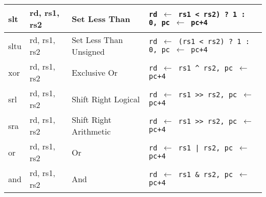 \begin{tabular}{|ll|l|l|}
\hline
slt   & rd, rs1, rs2   & Set Less Than            & {\tt rd $\leftarrow$ rs1 < rs2) ? 1 : 0, pc $\leftarrow$ pc+4}\\
\hline
sltu  & rd, rs1, rs2   & Set Less Than Unsigned   & {\tt rd $\leftarrow$ (rs1 < rs2) ? 1 : 0, pc $\leftarrow$ pc+4}\\
\hline
xor   & rd, rs1, rs2   & Exclusive Or             & {\tt rd $\leftarrow$ rs1 \^{} rs2, pc $\leftarrow$ pc+4}\\
\hline
srl   & rd, rs1, rs2   & Shift Right Logical      & {\tt rd $\leftarrow$ rs1 >> rs2, pc $\leftarrow$ pc+4}\\
\hline
sra   & rd, rs1, rs2   & Shift Right Arithmetic   & {\tt rd $\leftarrow$ rs1 >> rs2, pc $\leftarrow$ pc+4}\\
\hline
or    & rd, rs1, rs2   & Or                       & {\tt rd $\leftarrow$ rs1 | rs2, pc $\leftarrow$ pc+4}\\
\hline
and   & rd, rs1, rs2   & And                      & {\tt rd $\leftarrow$ rs1 \& rs2, pc $\leftarrow$ pc+4}\\
\hline
\end{tabular}

